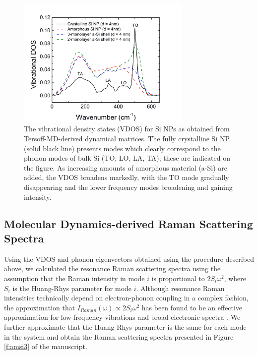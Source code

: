 \begin{figure}
\begin{center}
\includegraphics[width=0.75\textwidth]{./appendixD/simd1.png}
\caption[Vibrational density of states for core-shell amorphous-crystalline Si NPs.]{The vibrational density states (VDOS) for Si NPs as obtained from Tersoff-MD-derived dynamical matrices. The fully crystalline Si NP (solid black line) presents modes which clearly correspond to the phonon modes of bulk Si (TO, LO, LA, TA); these are indicated on the figure. As increasing amounts of amorphous material (a-Si) are added, the VDOS broadens markedly, with the TO mode gradually disappearing and the lower frequency modes broadening and gaining intensity.}
\label{f:simd1}
\end{center}
\end{figure}

\subsection{Molecular Dynamics-derived Raman Scattering Spectra}
Using the VDOS and phonon eigenvectors obtained using the procedure described above, we calculated the resonance Raman scattering spectra using the assumption that the Raman intensity in mode $i$ is proportional to $2S_i\omega^2$, where $S_i$ is the Huang-Rhys parameter for mode $i$. Although resonance Raman intensities technically depend on electron-phonon coupling in a complex fashion, the approximation that $I_{Raman}(\omega) \propto 2S_i\omega^2$ has been found to be an effective approximation for low-frequency vibrations and broad electronic spectra \cite{harris1983simple, doi:10.1021/nn201475d}. We further approximate that the Huang-Rhys parameter is the same for each mode in the system and obtain the Raman scattering spectra presented in Figure \ref{f:amsi3} of the manuscript. 
